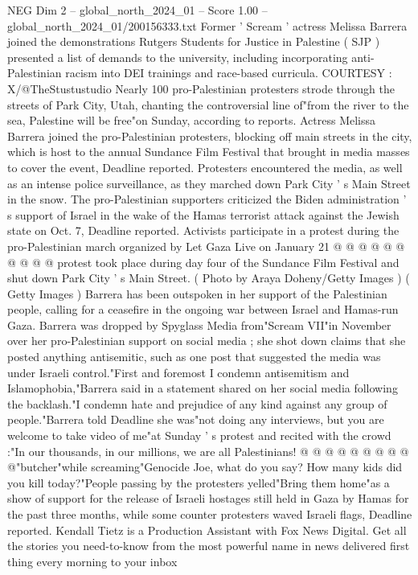\begin{textsample}{NEG Dim 2 – global\_north\_2024\_01 – Score 1.00 – global\_north\_2024\_01/200156333.txt}  \label{ex:f2_neg_245}
Former ' Scream ' actress Melissa Barrera joined the demonstrations Rutgers Students for Justice in Palestine ( SJP ) presented a list of demands to the university, including incorporating anti-Palestinian racism into DEI trainings and race-based curricula.
COURTESY : X/@TheStustustudio Nearly 100 pro-Palestinian protesters strode through the streets of Park City, Utah, chanting the controversial line of"from the river to the sea, Palestine will be free"on Sunday, according to reports.
Actress Melissa Barrera joined the pro-Palestinian protesters, blocking off main streets in the city, which is host to the annual Sundance Film Festival that brought in media masses to cover the event, Deadline reported.
Protesters encountered the media, as well as an intense police surveillance, as they marched down Park City ' s Main Street in the snow.
The pro-Palestinian supporters criticized the Biden administration ' s support of Israel in the wake of the Hamas terrorist attack against the Jewish state on Oct. 7, Deadline reported.
Activists participate in a protest during the pro-Palestinian march organized by Let Gaza Live on January 21 @ @ @ @ @ @ @ @ @ @ protest took place during day four of the Sundance Film Festival and shut down Park City ' s Main Street. ( Photo by Araya Doheny/Getty Images ) ( Getty Images ) Barrera has been outspoken in her support of the Palestinian people, calling for a ceasefire in the ongoing war between Israel and Hamas-run Gaza.
Barrera was dropped by Spyglass Media from"Scream VII"in November over her pro-Palestinian support on social media ; she shot down claims that she posted anything antisemitic, such as one post that suggested the media was under Israeli control."First and foremost I condemn antisemitism and Islamophobia,"Barrera said in a statement shared on her social media following the backlash."I condemn hate and prejudice of any kind against any group of people."Barrera told Deadline she was"not doing any interviews, but you are welcome to take video of me"at Sunday ' s protest and recited with the crowd :"In our thousands, in our millions, we are all Palestinians! @ @ @ @ @ @ @ @ @ @"butcher"while screaming"Genocide Joe, what do you say?
How many kids did you kill today?"People passing by the protesters yelled"Bring them home"as a show of support for the release of Israeli hostages still held in Gaza by Hamas for the past three months, while some counter protesters waved Israeli flags, Deadline reported.
Kendall Tietz is a Production Assistant with Fox News Digital.
Get all the stories you need-to-know from the most powerful name in news delivered first thing every morning to your inbox

\end{textsample}
